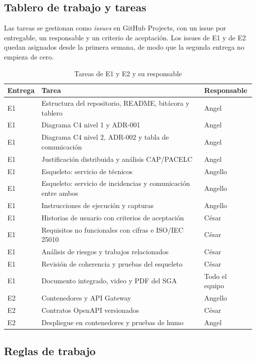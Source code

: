 \subsection{Tablero de trabajo y tareas}

Las tareas se gestionan como \emph{issues} en GitHub Projects, con un issue por entregable, un
responsable y un criterio de aceptación. Los issues de E1 y de E2 quedan asignados desde la primera
semana, de modo que la segunda entrega no empieza de cero.

\begin{table}[H]
\centering
\caption{Tareas de E1 y E2 y su responsable}
\label{tab:tareas}
\small
\begin{tabularx}{\linewidth}{@{}lYl@{}}
\toprule
Entrega & Tarea & Responsable \\
\midrule
E1 & Estructura del repositorio, README, bitácora y tablero & Angel \\
E1 & Diagrama C4 nivel 1 y ADR-001 & Angel \\
E1 & Diagrama C4 nivel 2, ADR-002 y tabla de comunicación & Angel \\
E1 & Justificación distribuida y análisis CAP/PACELC & Angel \\
E1 & Esqueleto: servicio de técnicos & Angello \\
E1 & Esqueleto: servicio de incidencias y comunicación entre ambos & Angello \\
E1 & Instrucciones de ejecución y capturas & Angello \\
E1 & Historias de usuario con criterios de aceptación & César \\
E1 & Requisitos no funcionales con cifras e ISO/IEC 25010 & César \\
E1 & Análisis de riesgos y trabajos relacionados & César \\
E1 & Revisión de coherencia y pruebas del esqueleto & César \\
E1 & Documento integrado, video y PDF del SGA & Todo el equipo \\
E2 & Contenedores y API Gateway & Angello \\
E2 & Contratos OpenAPI versionados & César \\
E2 & Despliegue en contenedores y pruebas de humo & Angel \\
\bottomrule
\end{tabularx}
\end{table}

\subsection{Reglas de trabajo}

